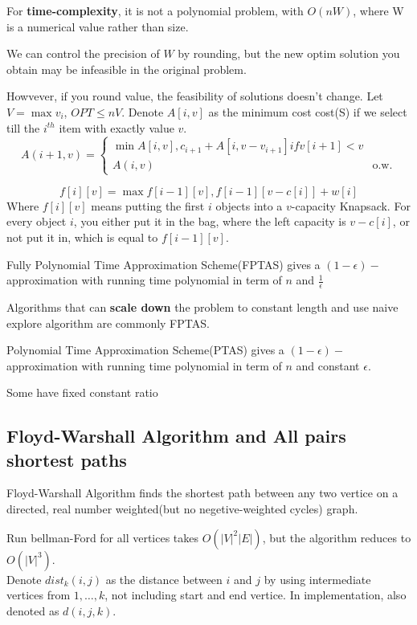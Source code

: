 For \textbf{time-complexity}, it is not a polynomial problem, with $O(nW)$, where W is a numerical value rather than size.

We can control the precision of $W$ by rounding, but the new optim solution you obtain may be infeasible in the original problem.

Howvever, if you round value, the feasibility of solutions doesn't change. 
Let $V=\max v_i$, $OPT\leq nV$. Denote $A[i,v]$ as the minimum cost cost(S) if we select till the $i^{th}$ item with exactly value $v$.
\begin{equation}
    A(i+1,v)= 
    \begin{cases}
    \min{A[i,v],c_{i+1}+A[i,v-v_{i+1}]} if v[i+1]<v\\
    A(i,v) & \text{o.w.}
    \end{cases}
\end{equation}

\[
    f[i][v]=\max{f[i-1][v],f[i-1][v-c[i]]+w[i]}\]
Where $f[i][v]$ means putting the first $i$ objects into a $v$-capacity Knapsack. For every object $i$, you either put it in the bag, where the left capacity is $v-c[i]$, or not put it in, which is equal to $f[i-1][v]$.

\begin{remark}
    Fully Polynomial Time Approximation Scheme(FPTAS) gives a $(1-\epsilon)-$approximation with running time polynomial in term of $n$ and $\frac{1}{\epsilon}$

    Algorithms that can \textbf{scale down} the problem to constant length and use naive explore algorithm are commonly FPTAS.

    Polynomial Time Approximation Scheme(PTAS)
    gives a $(1-\epsilon)-$approximation with running time polynomial in term of $n$ and constant $\epsilon$.

    Some have fixed constant ratio
\end{remark}

\subsection{Floyd-Warshall Algorithm and All pairs shortest paths}
Floyd-Warshall Algorithm finds the shortest path between any two vertice on a directed, real number weighted(but no negetive-weighted cycles) graph.

Run bellman-Ford for all vertices takes $O(|V|^2|E|)$, but the algorithm reduces to $O(|V|^3)$.\\
Denote $dist_k(i,j)$ as the distance between $i$ and $j$ by using intermediate vertices from ${1,\ldots,k}$, not including start and end vertice. In implementation, also denoted as $d(i,j,k)$.

